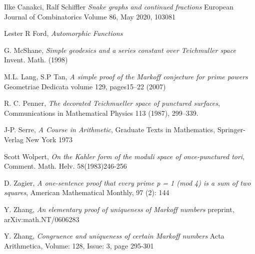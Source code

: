 \documentclass[12pt,a4paper]{amsart}
\begin{document}
Ilke Canakci, Ralf Schiffler
\textit{Snake graphs and continued fractions}
European Journal of Combinatorics
Volume 86, May 2020, 103081


Lester R Ford,
\textit{Automorphic Functions}

G. McShane,
\textit{Simple geodesics and a series constant over Teichmuller space}
Invent. Math. (1998)

M.L. Lang, S.P Tan,
\textit{A simple proof of the Markoff conjecture for prime powers}
Geometriae Dedicata volume 129, pages15–22 (2007)

R. C. Penner, 
\textit{The decorated Teichmueller space of punctured surfaces}, 
Communications in Mathematical Physics 113 (1987), 299–339.





J-P. Serre,
\textit{A Course in Arithmetic},
Graduate Texts in Mathematics,
Springer-Verlag New York
1973

Scott Wolpert,
\textit{On the Kahler form of the moduli space of once-punctured tori}, 
Comment. Math. Helv. 58(1983)246-256

D. Zagier,
 \textit{A one-sentence proof that every prime p = 1 (mod 4) is a sum of two squares}, 
 American Mathematical Monthly, 97 (2): 144
 
 Y. Zhang,
 \textit{ An elementary proof of uniqueness of Markoff numbers}
 preprint, arXiv:math.NT/0606283
 
   Y. Zhang,
 \textit{Congruence and uniqueness of certain Markoff numbers}
 Acta Arithmetica, Volume: 128, Issue: 3, page 295-301




%
%
%
%
%
%
%
%



% 
 
\end{document}
